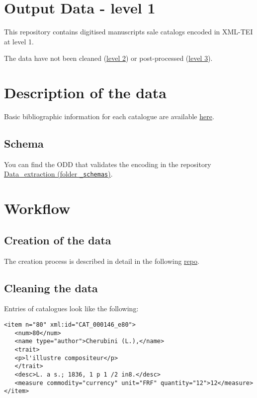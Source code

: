 \section*{Output Data - level 1}

This repository contains digitised manuscripts sale catalogs encoded in XML-TEI at level 1.

The data have not been cleaned (\href{https://github.com/katabase/2\_CleanedData}{level 2}) or post-processed (\href{https://github.com/katabase/3\_TaggedData}{level 3}).
\section*{Description of the data}

Basic bibliographic information for each catalogue are available \href{https://github.com/katabase/1\_OutputData/blob/master/\_listDATA.csv}{here}.
\subsection*{Schema}

You can find the ODD that validates the encoding in the repository \href{https://github.com/katabase/Data\_extraction/tree/master/\_schemas}{Data\_extraction (folder \texttt{\_schemas})}.
\section*{Workflow}
\subsection*{Creation of the data}

The creation process is described in detail in the following \href{https://github.com/katabase/GROBID\_Dictionaries/blob/master/DOCUMENTATION.md}{repo}.
\subsection*{Cleaning the data}

Entries of catalogues look like the following:

\begin{listing}[h!]
   \begin{verbatim}
<item n="80" xml:id="CAT_000146_e80">
   <num>80</num>
   <name type="author">Cherubini (L.),</name>
   <trait>
   <p>l'illustre compositeur</p>
   </trait>
   <desc>L. a s.; 1836, 1 p 1 /2 in8.</desc>
   <measure commodity="currency" unit="FRF" quantity="12">12</measure>
</item>

   \end{verbatim}
\end{listing}

